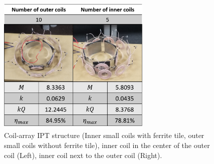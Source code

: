 \begin{figure}[!t]
    \centering
    \includegraphics[width=0.65\textwidth]{images/4_coil_6_10_inner_with_ferrite.png}
    \caption{Coil-array IPT structure (Inner small coils with ferrite tile, outer small coils without ferrite tile), inner coil in the center of the outer coil (Left), inner coil next to the outer coil (Right).}
    \label{fig: coil-array result3}
\end{figure}


